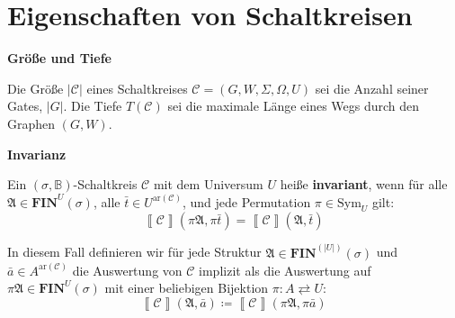 \section{Eigenschaften von Schaltkreisen}
\begin{defn}
\textbf{Größe und Tiefe}

Die Größe $\left|\mathcal{C}\right|$ eines Schaltkreises $\mathcal{C}=\left(G,W,\Sigma,\Omega,U\right)$
sei die Anzahl seiner Gates, $\left|G\right|$. Die Tiefe $T\left(\mathcal{C}\right)$
sei die maximale Länge eines Wegs durch den Graphen $\left(G,W\right)$.
\end{defn}
%
\begin{defn}
\textbf{Invarianz}

Ein $\left(\sigma,\mathbb{B}\right)$-Schaltkreis $\mathcal{C}$ mit
dem Universum $U$ heiße \textbf{invariant}, wenn für alle $\mathfrak{A}\in\mathbf{FIN}^{U}\left(\sigma\right)$,
alle $\bar{t}\in U^{\mathrm{ar}\left(\mathcal{C}\right)}$, und jede
Permutation $\pi\in\mathrm{Sym}_{U}$ gilt:
\[
\left\llbracket \mathcal{C}\right\rrbracket \left(\pi\mathfrak{A},\pi\bar{t}\right)=\left\llbracket \mathcal{C}\right\rrbracket \left(\mathfrak{A},\bar{t}\right)
\]

In diesem Fall definieren wir für jede Struktur $\mathfrak{A}\in\mathbf{FIN}^{\left(\left|U\right|\right)}\left(\sigma\right)$
und $\bar{a}\in A^{\mathrm{ar}\left(\mathcal{C}\right)}$ die Auswertung
von $\mathcal{C}$ implizit als die Auswertung auf $\pi\mathfrak{A}\in\mathbf{FIN}^{U}\left(\sigma\right)$
mit einer beliebigen Bijektion $\pi:A\rightleftarrows U$:
\[
\left\llbracket \mathcal{C}\right\rrbracket \left(\mathfrak{A},\bar{a}\right)\coloneqq\left\llbracket \mathcal{C}\right\rrbracket \left(\pi\mathfrak{A},\pi\bar{a}\right)
\]
\end{defn}
%
